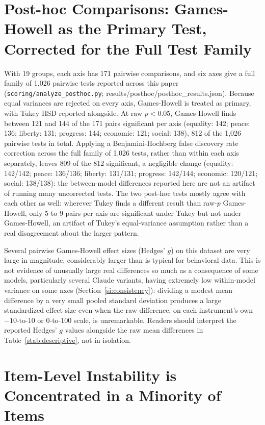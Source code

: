 \documentclass[11pt]{article}
\begin{document}
\section{Post-hoc Comparisons: Games-Howell as the Primary Test, Corrected for the Full Test Family}

With 19 groups, each axis has 171 pairwise comparisons, and six axes give a
full family of 1{,}026 pairwise tests reported across this paper
(\texttt{scoring/analyze\_posthoc.py}; results/posthoc/posthoc\_results.json).
Because
equal variances are rejected on every axis, Games-Howell is treated as
primary, with Tukey HSD reported alongside. At raw $p<0.05$, Games-Howell
finds between 121 and 144 of the 171 pairs significant per axis (equality:
142; peace: 136; liberty: 131; progress: 144; economic: 121; social: 138),
812 of the 1{,}026 pairwise tests in total. Applying a Benjamini-Hochberg
false discovery rate correction across the full family of 1{,}026 tests,
rather than within each axis separately, leaves 809 of the 812 significant,
a negligible change (equality: 142/142; peace: 136/136; liberty: 131/131;
progress: 142/144; economic: 120/121; social: 138/138): the between-model
differences reported here are not an artifact of running many uncorrected
tests. The two post-hoc tests mostly agree with each other as well: wherever
Tukey finds a different result than raw-$p$ Games-Howell, only 5 to 9 pairs
per axis are significant under Tukey but not under Games-Howell, an
artifact of Tukey's equal-variance assumption rather than a real
disagreement about the larger pattern.

Several pairwise Games-Howell effect sizes (Hedges' $g$) on this dataset are
very large in magnitude, considerably larger than is typical for behavioral
data. This is not evidence of unusually large real differences so much as a
consequence of some models, particularly several Claude variants, having
extremely low within-model variance on some axes (Section~\ref{si:consistency}):
dividing a modest mean difference by a very small pooled standard deviation
produces a large standardized effect size even when the raw difference, on
each instrument's own $-10$-to-$10$ or 0-to-100 scale, is unremarkable.
Readers should interpret the reported Hedges' $g$ values alongside the raw
mean differences in Table~\ref{stab:descriptive}, not in isolation.

\section{Item-Level Instability is Concentrated in a Minority of Items}
\label{si:item-entropy}
\end{document}
